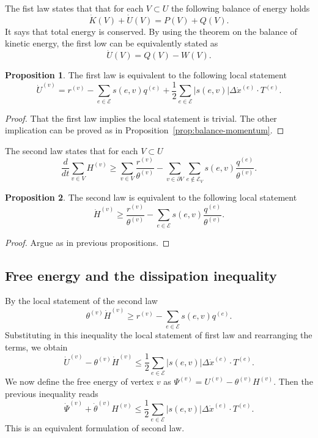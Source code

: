\documentclass[a4paper,11pt]{article}
\theoremstyle{definition}
\newtheorem{proposition}{Proposition}
\begin{document}
The fist law states that that for each $V\subset U$ the following balance of energy holds
\[
\dot{K}(V)+\dot{U}(V)=P(V)+Q(V).
\]
It says that total energy is conserved. By using the theorem on the balance of kinetic energy, the first low can be equivalently stated as
\[
\dot{U}(V)=Q(V)-W(V).
\]
\begin{proposition}
The first law is equivalent to the following local statement
\[
\dot{U}^{(v)}=r^{(v)}-\sum_{e\in\mathscr{E}}s(e,v)q^{(e)}+\frac{1}{2}\sum_{e\in\mathscr{E}}|s(e,v)|\Delta \dot{x}^{(e)}\cdot T^{(e)}.
\]
\end{proposition}
\begin{proof}
That the first law implies the local statement is trivial. The other implication can be proved as in Proposition~\ref{prop:balance-momentum}.
\end{proof}

The second law states that for each $V\subset U$
\[
\frac{d}{dt}\sum_{v\in V}H^{(v)}\ge\sum_{v\in V}\frac{r^{(v)}}{\theta^{(v)}}-\sum_{v\in\partial V}\sum_{e\notin\mathscr{E}_V}s(e,v)\frac{q^{(e)}}{\theta^{(v)}}.
\]
\begin{proposition}
The second law is equivalent to the following local statement
\[
\dot{H}^{(v)}\ge \frac{r^{(v)}}{\theta^{(v)}}-\sum_{e\in\mathscr{E}}s(e,v)\frac{q^{(e)}}{\theta^{(v)}}.
\]
\end{proposition}
\begin{proof}
Argue as in previous propositions.
\end{proof}

\subsection*{Free energy and the dissipation inequality}

By the local statement of the second law
\[
\theta^{(v)}\dot{H}^{(v)}\ge r^{(v)}-\sum_{e\in\mathscr{E}}s(e,v)q^{(e)}.
\]
Substituting in this inequality the local statement of first law and rearranging the terms, we obtain
\[
\dot{U}^{(v)}-\theta^{(v)}\dot{H}^{(v)}\le\frac{1}{2}\sum_{e\in\mathscr{E}}|s(e,v)|\Delta \dot{x}^{(e)}\cdot T^{(e)}.
\]
We now define the free energy of vertex $v$ as $\Psi^{(v)}=U^{(v)}-\theta^{(v)}H^{(v)}$. Then the previous inequality reads
\[
\dot{\Psi}^{(v)}+\dot{\theta}^{(v)}H^{(v)}\le\frac{1}{2}\sum_{e\in\mathscr{E}}|s(e,v)|\Delta \dot{x}^{(e)}\cdot T^{(e)}.
\]
This is an equivalent formulation of second law.
\end{document}
